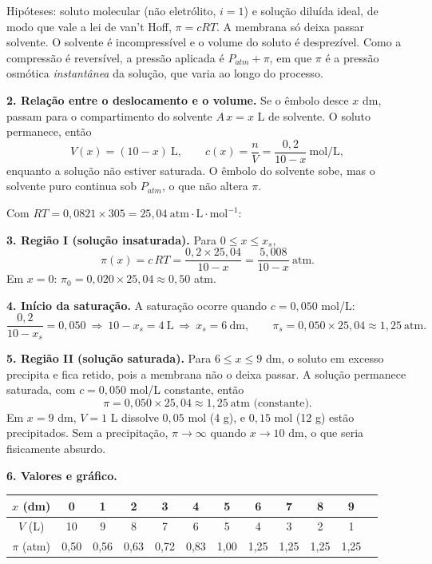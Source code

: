 \documentclass{article}%
\begin{document}
Hipóteses: soluto molecular (não eletrólito, $i=1$) e solução diluída ideal, de modo que vale a lei de van't Hoff, $\pi=cRT$. A membrana só deixa passar solvente. O solvente é incompressível e o volume do soluto é desprezível. Como a compressão é reversível, a pressão aplicada é $P_{atm}+\pi$, em que $\pi$ é a pressão osmótica \emph{instantânea} da solução, que varia ao longo do processo.

\textbf{2. Relação entre o deslocamento e o volume.} Se o êmbolo desce $x$ dm, passam para o compartimento do solvente $A\,x=x$ L de solvente. O soluto permanece, então
\[
V(x)=(10-x)\ \text{L},\qquad c(x)=\frac{n}{V}=\frac{0{,}2}{10-x}\ \text{mol/L},
\]
enquanto a solução não estiver saturada. O êmbolo do solvente sobe, mas o solvente puro continua sob $P_{atm}$, o que não altera $\pi$.

Com $RT=0{,}0821\times 305=25{,}04\ \text{atm}\cdot\text{L}\cdot\text{mol}^{-1}$:

\textbf{3. Região I (solução insaturada).} Para $0\le x\le x_s$,
\[
\pi(x)=c\,RT=\frac{0{,}2\times 25{,}04}{10-x}=\frac{5{,}008}{10-x}\ \text{atm}.
\]
Em $x=0$: $\pi_0=0{,}020\times 25{,}04\approx 0{,}50$ atm.

\textbf{4. Início da saturação.} A saturação ocorre quando $c=0{,}050$ mol/L:
\[
\frac{0{,}2}{10-x_s}=0{,}050\ \Rightarrow\ 10-x_s=4\ \text{L}\ \Rightarrow\ x_s=6\ \text{dm},\qquad
\pi_s=0{,}050\times 25{,}04\approx 1{,}25\ \text{atm}.
\]

\textbf{5. Região II (solução saturada).} Para $6\le x\le 9$ dm, o soluto em excesso precipita e fica retido, pois a membrana não o deixa passar. A solução permanece saturada, com $c=0{,}050$ mol/L constante, então
\[
\pi=0{,}050\times 25{,}04\approx 1{,}25\ \text{atm (constante)}.
\]
Em $x=9$ dm, $V=1$ L dissolve $0{,}05$ mol (4 g), e $0{,}15$ mol (12 g) estão precipitados. Sem a precipitação, $\pi\to\infty$ quando $x\to 10$ dm, o que seria fisicamente absurdo.

\textbf{6. Valores e gráfico.}
\begin{center}
\begin{tabular}{c|ccccccccccc}
$x$ (dm) & 0 & 1 & 2 & 3 & 4 & 5 & 6 & 7 & 8 & 9\\ \hline
$V$ (L) & 10 & 9 & 8 & 7 & 6 & 5 & 4 & 3 & 2 & 1\\
$\pi$ (atm) & 0,50 & 0,56 & 0,63 & 0,72 & 0,83 & 1,00 & 1,25 & 1,25 & 1,25 & 1,25
\end{tabular}
\end{center}
\end{document}
